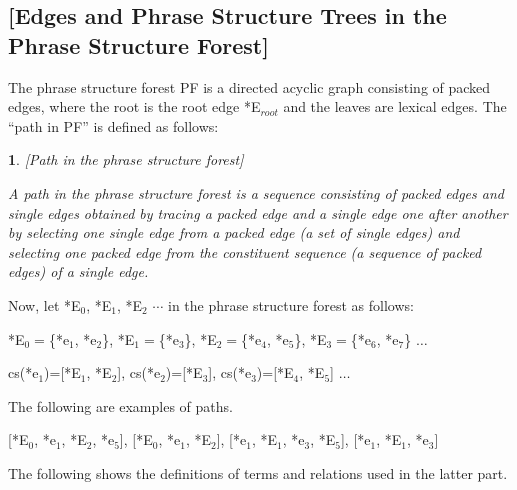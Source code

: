 \documentclass[english]{jnlp_1.4_rep}
\theoremstyle{break}
\theoremstyle{plain}
\theoremstyle{plain}
\newtheorem{definition}{}
\begin{document}
\subsection*{[Edges and Phrase Structure Trees in the Phrase Structure Forest]}

The phrase structure forest PF is a directed acyclic graph consisting
of packed edges, where the root is the root edge *E$_{root}$ and the
leaves are lexical edges. The ``path in PF'' is defined as follows:

\clearpage
\begin{definition}\label{def:PathInPF}[Path in the phrase structure forest]

A path in the phrase structure forest is a sequence consisting of
packed edges and single edges obtained by tracing a packed edge and a
single edge one after another by selecting one single edge from a
packed edge (a set of single edges) and selecting one packed edge from
the constituent sequence (a sequence of packed edges) of a single
edge.
\end{definition}

\noindent
Now, let *E$_0$, *E$_1$, *E$_2$ ${\cdots}$ in the phrase structure forest as follows:

*E$_0=$\{*e$_1$, *e$_2$\}, *E$_1=$\{*e$_3$\}, *E$_2=$\{*e$_4$, *e$_5$\}, *E$_3=$\{*e$_6$, *e$_7$\} ${\ldots}$

cs(*e$_1$)=[*E$_1$, *E$_2$], cs(*e$_2$)=[*E$_3$], cs(*e$_3$)=[*E$_4$, *E$_5$] ${\ldots}$

\noindent
The following are examples of paths.

[*E$_0$, *e$_1$, *E$_2$, *e$_5$], [*E$_0$, *e$_1$, *E$_2$], [*e$_1$, *E$_1$, *e$_3$, *E$_5$], [*e$_1$, *E$_1$, *e$_3$]

\noindent
The following shows the definitions of terms and relations used in the latter part.
\end{document}
